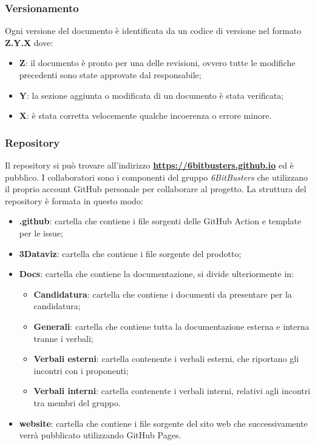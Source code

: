 \subsubsection{Versionamento}
Ogni versione del documento è identificata da un codice di versione nel formato
\textbf{Z.Y.X} dove:
\begin{itemize}
    \item \textbf{Z}: il documento è pronto per una delle revisioni, ovvero tutte le modifiche precedenti sono state approvate dal responsabile;
    \item \textbf{Y}: la sezione aggiunta o modificata di un documento è stata verificata;
    \item \textbf{X}: è stata corretta velocemente qualche incoerenza o errore minore.
\end{itemize}
\subsubsection{Repository}
Il repository si può trovare all'indirizzo
\textbf{\url{https://6bitbusters.github.io}} ed è pubblico. I collaboratori
sono i componenti del gruppo \textit{6BitBusters} che utilizzano il proprio
account GitHub personale per collaborare al progetto. La struttura del
repository è formata in questo modo:
\begin{itemize}
    \item \textbf{ .github}: cartella che contiene i file sorgenti delle GitHub Action e template per le issue;
    \item \textbf{3Dataviz}: cartella che contiene i file sorgente del prodotto;
    \item \textbf{Docs}: cartella che contiene la documentazione, si divide ulteriormente in:
          \begin{itemize}
              \item \textbf{Candidatura}: cartella che contiene i documenti da presentare per la candidatura;
              \item \textbf{Generali}: cartella che contiene tutta la documentazione esterna e interna tranne i verbali;
              \item \textbf{Verbali esterni}: cartella contenente i verbali esterni, che riportano gli incontri con i proponenti;
              \item \textbf{Verbali interni}: cartella contenente i verbali interni, relativi agli incontri tra membri del gruppo.
          \end{itemize}
    \item \textbf{website}: cartella che contiene i file sorgente del sito web che successivamente verrà pubblicato utilizzando GitHub Pages.
\end{itemize}

